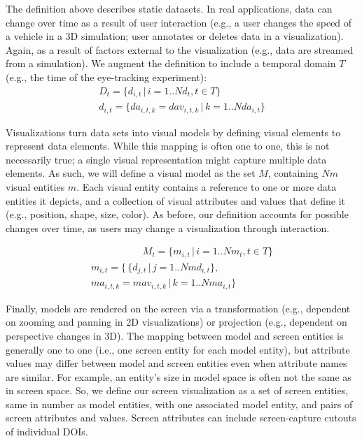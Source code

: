 The definition above describes static datasets. In real applications, data can change over time as a result of user interaction (e.g., a user changes the speed of a vehicle in a 3D simulation; user annotates or deletes data in a visualization). Again, as a result of factors external to the visualization (e.g., data are streamed from a simulation). We augment the definition to include a temporal domain $T$ (e.g., the time of the eye-tracking experiment):
\begin{equation*}
\begin{split}
D_t = \{d_{i,t} \,|\, i=1..N\!d_t, t \in T\} \\
d_{i,t} = \{da_{i,t,k} = dav_{i,t,k} \,|\, k=1..N\!da_{i,t}\}
\end{split}
\end{equation*}

Visualizations turn data sets into visual models by defining visual elements to represent data elements. While this mapping is often one to one, this is not necessarily true; a single visual representation might capture multiple data elements. As such, we will define a visual model as the set $M$, containing $N\!m$ visual entities $m$. Each visual entity contains a reference to one or more data entities it depicts, and a collection of visual attributes and values that define it (e.g., position, shape, size, color). As before, our definition accounts for possible changes over time, as users may change a visualization through interaction.  

\vspace{-4mm}
\begin{multline*}
\qquad\qquad\quad\; M_t = \{m_{i,t} \,|\, i=1..N\!m_t, t \in T\} \\
m_{i,t} = \{\,\{d_{j,t}\,|\, j=1..N\!md_{i,t}\}, \\ ma_{i,t,k} = mav_{i,t,k} \,|\, k=1..N\!ma_{i,t}\}
\end{multline*}

Finally, models are rendered on the screen via a transformation (e.g., dependent on zooming and panning in 2D visualizations) or projection (e.g., dependent on perspective changes in 3D). The mapping between model and screen entities is generally one to one (i.e., one screen entity for each model entity), but attribute values may differ between model and screen entities even when attribute names are similar. For example, an entity's size in model space is often not the same as in screen space. So, we define our screen visualization as a set of screen entities, same in number as model entities, with one associated model entity, and pairs of screen attributes and values. Screen attributes can include screen-capture cutouts of individual DOIs.


